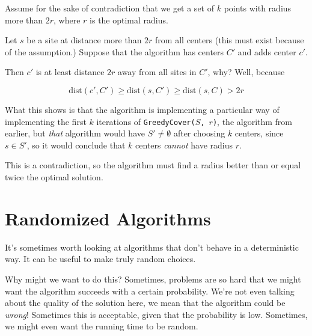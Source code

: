 \documentclass[12pt]{article}
\def\dist{\text{dist}}
\begin{document}
  {
    Assume for the sake of contradiction that we get a set of $k$ points with
    radius more than $2r$, where $r$ is the optimal radius. 


    Let $s$ be a site at distance more than $2r$ from all centers (this must
    exist because of the assumption.) Suppose that the algorithm has centers
    $C'$ and adds center $c'$.

    Then $c'$ is at least distance $2r$ away from all sites in $C'$, why? Well,
    because 

    \[
      \dist(c', C') \ge \dist(s, C') \ge \dist(s, C) > 2r
    \]

    What this shows is that the algorithm is implementing a particular way of
    implementing the first $k$ iterations of \texttt{GreedyCover($S$, $r$)}, the
    algorithm from earlier, but {\it that} algorithm would have $S' \ne
    \emptyset$ after choosing $k$ centers, since $s \in S'$, so it would
    conclude that $k$ centers {\it cannot} have radius $r$. 

    This is a contradiction, so the algorithm must find a radius better than or
    equal twice the optimal solution.
  }




  \newpage
  \section{Randomized Algorithms}

  It's sometimes worth looking at algorithms that don't behave in a
  deterministic way. It can be useful to make truly random choices.

  Why might we want to do this? Sometimes, problems are so hard that we might
  want the algorithm succeeds with a certain probability. We're not even talking
  about the quality of the solution here, we mean that the algorithm could be
  {\it wrong}! Sometimes this is acceptable, given that the probability is low.
  Sometimes, we might even want the running time to be random.
\end{document}
